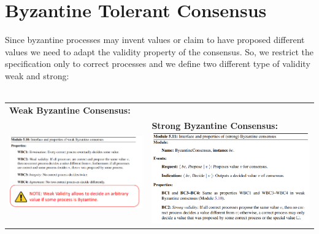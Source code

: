 \documentclass{article}
\begin{document}
\section{Byzantine Tolerant Consensus}
Since byzantine processes may invent values or claim to have proposed different values we need to adapt the validity property of the consensus. So, we restrict the specification only to correct processes and we define two different type of validity weak and strong:\\\\
\begin{tabular}{C{8cm}  L{10.5cm}}
\textbf{Weak Byzantine Consensus:}\\
\includegraphics[scale=0.7]{cattura84.png} &
\textbf{Strong Byzantine Consensus:}
\includegraphics[scale=0.7]{cattura85.png}
\end{tabular}
\end{document}

